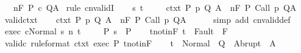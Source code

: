 \begin{isabellebody}
\ \ \ {\isachardoublequoteopen}{\isasymGamma}{\isacharcomma}{\isasymTheta}{\isasymTurnstile}n{\isacharcolon}\isactrlbsub {\isacharslash}F\isactrlesub \ P\ c\ Q{\isacharcomma}A{\isachardoublequoteclose}\isanewline
%
\isadelimproof
%
\endisadelimproof
%
\isatagproof
{}\isamarkupfalse%
\ {\isacharparenleft}rule\ cnvalidI{\isacharparenright}\isanewline
\ \ \isamarkupfalse%
\ s\ t\ \isanewline
\ \ \isamarkupfalse%
\ ctxt{\isacharcolon}\ {\isachardoublequoteopen}{\isasymforall}{\isacharparenleft}P{\isacharcomma}\ p{\isacharcomma}\ Q{\isacharcomma}\ A{\isacharparenright}{\isasymin}{\isasymTheta}{\isachardot}\ {\isasymGamma}\ {\isasymTurnstile}n{\isacharcolon}\isactrlbsub {\isacharslash}F\isactrlesub \ P\ {\isacharparenleft}Call\ p{\isacharparenright}\ Q{\isacharcomma}A{\isachardoublequoteclose}\isanewline
\ \ \isamarkupfalse%
\ valid{\isacharunderscore}ctxt\isanewline
\ \ \isamarkupfalse%
\ ctxt{\isacharprime}{\isacharcolon}\ {\isachardoublequoteopen}{\isasymforall}{\isacharparenleft}P{\isacharcomma}\ p{\isacharcomma}\ Q{\isacharcomma}\ A{\isacharparenright}{\isasymin}{\isasymTheta}{\isacharprime}{\isachardot}\ {\isasymGamma}\ {\isasymTurnstile}n{\isacharcolon}\isactrlbsub {\isacharslash}F\isactrlesub \ P\ {\isacharparenleft}Call\ p{\isacharparenright}\ Q{\isacharcomma}A{\isachardoublequoteclose}\isanewline
\ \ \ \ \isamarkupfalse%
\ {\isacharparenleft}simp\ add{\isacharcolon}\ cnvalid{\isacharunderscore}def{\isacharparenright}\isanewline
\ \ \isamarkupfalse%
\ exec{\isacharcolon}\ {\isachardoublequoteopen}{\isasymGamma}{\isasymturnstile}{\isasymlangle}c{\isacharcomma}Normal\ s{\isasymrangle}\ {\isacharequal}n{\isasymRightarrow}\ t{\isachardoublequoteclose}\ \isanewline
\ \ \isamarkupfalse%
\ P{\isacharcolon}\ {\isachardoublequoteopen}s\ {\isasymin}\ P{\isachardoublequoteclose}\isanewline
\ \ \isamarkupfalse%
\ t{\isacharunderscore}notin{\isacharunderscore}F{\isacharcolon}\ {\isachardoublequoteopen}t\ {\isasymnotin}\ Fault\ {\isacharbackquote}\ F{\isachardoublequoteclose}\isanewline
\ \ \isamarkupfalse%
\ valid{\isacharunderscore}c\ {\isacharbrackleft}rule{\isacharunderscore}format{\isacharbrackright}\ ctxt{\isacharprime}\ exec\ P\ t{\isacharunderscore}notin{\isacharunderscore}F\isanewline
\ \ \isamarkupfalse%
\ {\isachardoublequoteopen}t\ {\isasymin}\ Normal\ {\isacharbackquote}\ Q\ {\isasymunion}\ Abrupt\ {\isacharbackquote}\ A{\isachardoublequoteclose}\isanewline

\end{isabellebody}
